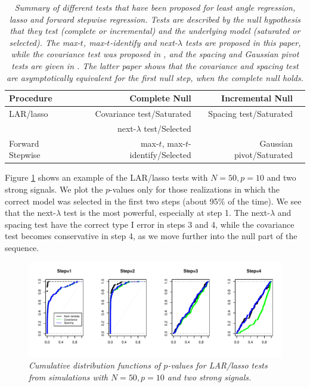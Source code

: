 \documentclass{article}
\begin{document}
\begin{table}
\begin{center}
\begin{tabular}{ | l | r|r| r}
        \hline
Procedure& Complete Null & Incremental Null\\
\hline
LAR/lasso& Covariance test/Saturated&Spacing test/Saturated \\
        & next-$\lambda$ test/Selected& \\
        \hline
Forward Stepwise &max-$t$, max-$t$-identify/Selected &Gaussian pivot/Saturated\\
\hline
\end{tabular}
\end{center}
\caption{\em Summary of different tests that have been proposed for least angle regression, lasso and forward stepwise regression.
Tests are described by the null hypothesis that they test (complete or incremental)  and the underlying model (saturated or selected).
The max-$t$, max-$t$-identify and next-$\lambda$ tests are proposed in this paper, while the covariance test was proposed in \citet{lockhart2014significance}, and the spacing and Gaussian
pivot tests are given in \citet{taylor2014exact}. The latter paper shows that the covariance and spacing test are asymptotically equivalent for the first null step, when the complete null holds.}
\label{tab:testsummary}
\end{table}
Figure  \ref{fig:larexample} shows an example of the LAR/lasso tests with $N=50, p=10$ and two strong signals.
We plot the $p$-values only for those realizations in which the correct model was selected in the first two steps (about 95\% of the time).
We see that the next-$\lambda$ test is the most powerful, especially at step 1. The next-$\lambda$ and spacing test have the correct type I error in steps 3 and 4,
while the covariance test becomes conservative in step 4, as we move further into the null part of the sequence.
\begin{figure}
  \includegraphics[width=\textwidth]{figs/larexample.pdf}
  \caption[fig:larexample]{\em  Cumulative distribution functions of $p$-values for LAR/lasso tests from simulations with $N=50,  p=10$ and two strong signals.}
  \label{fig:larexample}
\end{figure}
\end{document}
